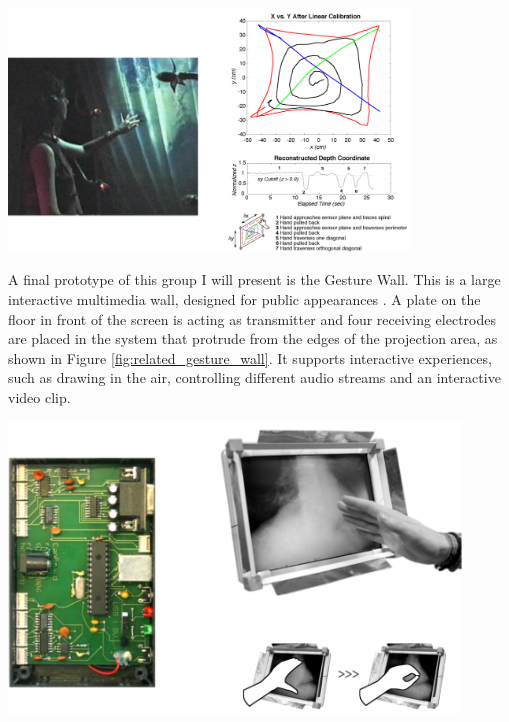 \begin{minipage}{\linewidth}
\centering
\includegraphics[width=0.8\textwidth]{images/related_gesture_wall}
\label{fig:related_gesture_wall}
\end{minipage}

A final prototype of this group I will present is the Gesture Wall. This is a large interactive multimedia wall, designed for public appearances \cite{smith1998electric}. A plate on the floor in front of the screen is acting as transmitter and four receiving electrodes are placed in the system that protrude from the edges of the projection area, as shown in Figure \ref{fig:related_gesture_wall}. It supports interactive experiences, such as drawing in the air, controlling different audio streams and an interactive video clip.

\begin{minipage}{\linewidth}
\centering
\includegraphics[width=0.9\textwidth]{images/related_ctk_thracker}
\label{fig:related_ctk_thracker}
\end{minipage}

